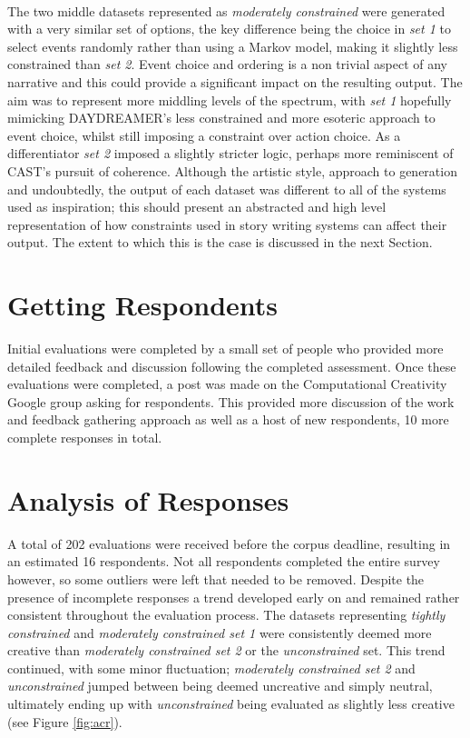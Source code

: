 \documentclass[letterpaper]{article}
\begin{document}
\\The two middle datasets represented as \emph{moderately constrained} were generated with a very similar set of options, the key difference being the choice in \emph{set 1} to select events randomly rather than using a Markov model, making it slightly less constrained than \emph{set 2}. Event choice and ordering is a non trivial aspect of any narrative and this could provide a significant impact on the resulting output. The aim was to represent more middling levels of the spectrum, with \emph{set 1} hopefully mimicking DAYDREAMER's less constrained and more esoteric approach to event choice, whilst still imposing a constraint over action choice. As a differentiator \emph{set 2} imposed a slightly stricter logic, perhaps more reminiscent of CAST's pursuit of coherence. Although the artistic style, approach to generation and undoubtedly, the output of each dataset was different to all of the systems used as inspiration; this should present an abstracted and high level representation of how constraints used in story writing systems can affect their output. The extent to which this is the case is discussed in the next Section.
\section{Getting Respondents}
Initial evaluations were completed by a small set of people who provided more detailed feedback and discussion following the completed assessment. Once these evaluations were completed, a post was made on the Computational Creativity Google group asking for respondents. This provided more discussion of the work and feedback gathering approach as well as a host of new respondents, 10 more complete responses in total. 

\section{Analysis of Responses}
A total of 202 evaluations were received before the corpus deadline, resulting in an estimated 16 respondents. Not all respondents completed the entire survey however, so some outliers were left that needed to be removed. 
Despite the presence of incomplete responses a trend developed early on and remained rather consistent throughout the evaluation process. The datasets representing \emph{tightly constrained} and \emph{moderately constrained set 1} were consistently deemed more creative than \emph{moderately constrained set 2} or the \emph{unconstrained} set. This trend continued, with some minor fluctuation; \emph{moderately constrained set 2} and \emph{unconstrained} jumped between being deemed uncreative and simply neutral,  ultimately ending up with \emph{unconstrained} being evaluated as slightly less creative (see Figure \ref{fig:acr}). 
\end{document}
